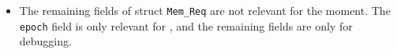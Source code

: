 \begin{frame}[fragile]
\begin{center}
\begin{minipage}{0.8\textwidth}
\begin{itemize}
{\begin{minipage}{0.8\textwidth}
	   \end{minipage}}

   \item The remaining fields of struct {\tt Mem\_Req} are not
     relevant for the moment.  The {\tt epoch} field is only relevant
     for {\FIFE}, and the remaining fields are only for debugging.

  \end{itemize}

 \end{minipage}
\end{center}

\end{frame}


